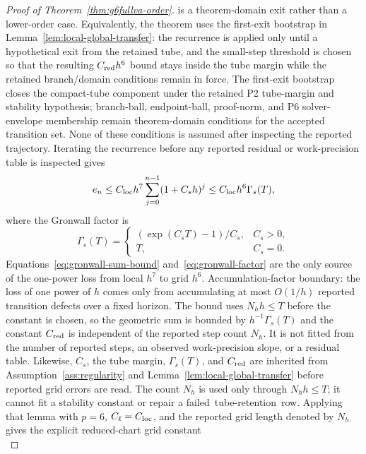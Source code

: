 \documentclass[preprint,12pt]{elsarticle}
\begin{document}
\begin{proof}[Proof of Theorem~\ref{thm:g6fullva-order}]
is a theorem-domain exit rather than a lower-order case.
Equivalently, the theorem uses the first-exit bootstrap in
Lemma~\ref{lem:local-global-transfer}: the recurrence is applied only until a
hypothetical exit from the retained tube, and the small-step threshold is
chosen so that the resulting \(C_{\rm red}h^6\) bound stays inside the tube
margin while the retained branch/domain conditions remain in force. The
first-exit bootstrap closes the compact-tube component under the retained P2
tube-margin and stability hypothesis; branch-ball, endpoint-ball, proof-norm,
and P6 solver-envelope membership remain theorem-domain conditions for the
accepted transition set. None of these conditions is assumed after inspecting
the reported trajectory. Iterating the recurrence
before any reported residual or work-precision table is inspected gives
\begin{equation}
\label{eq:gronwall-sum-bound}
  e_n\le C_{\rm loc}h^7
  \sum_{j=0}^{n-1}(1+C_s h)^j
  \le C_{\rm loc}h^6\Gamma_s(T),
\end{equation}
where the Gronwall factor is
\begin{equation}
\label{eq:gronwall-factor}
  \Gamma_s(T)=
  \begin{cases}
    (\exp(C_sT)-1)/C_s, & C_s>0,\\
    T, & C_s=0 .
  \end{cases}
\end{equation}
Equations~\eqref{eq:gronwall-sum-bound}
and~\eqref{eq:gronwall-factor} are the only source of the one-power loss
from local \(h^7\) to grid \(h^6\).
Accumulation-factor boundary: the loss of one power of \(h\)
comes only from accumulating at most \(O(1/h)\) reported transition defects
over a fixed horizon. The bound uses \(N_hh\le T\) before the constant is
chosen, so the geometric sum is bounded by \(h^{-1}\Gamma_s(T)\) and the
constant \(C_{\rm red}\) is independent of the reported step count \(N_h\).
It is not fitted from the number of reported steps, an observed
work-precision slope, or a residual table. Likewise, \(C_s\), the tube
margin, \(\Gamma_s(T)\), and \(C_{\rm red}\) are inherited from
Assumption~\ref{ass:regularity} and
Lemma~\ref{lem:local-global-transfer} before reported grid errors are read.
The count \(N_h\) is used only through \(N_hh\le T\); it cannot fit a
stability constant or repair a \mbox{failed tube-retention row}.
Applying that lemma with \(p=6\), \(C_\ell=C_{\rm loc}\), and the reported
grid length denoted by \(N_h\) gives the explicit reduced-chart grid constant
\begin{equation}

\end{equation}
\end{proof}
\end{document}
